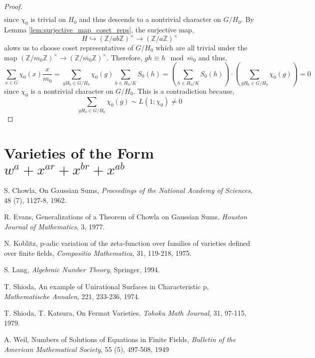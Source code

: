 \documentclass{article}
\newcommand{\Z}{\mathbb{Z}}
\theoremstyle{definition}
\theoremstyle{definition}
\theoremstyle{remark}
\begin{document}
\begin{proof}
\begin{align*}
\end{align*}
since $\chi_0$ is trivial on $H_0$ and thus descends to a nontrivial character on $G/H_0$. By Lemma \ref{lem:surjective_map_coset_reps}, the surjective map,
\[ H \hookrightarrow (\Z / ab \Z)^\times \to (\Z / a \Z)^\times \]
alows us to choose coset representatives of $G / H_0$ which are all trivial under the map $(\Z / m_0 \Z)^\times \to (\Z / \bar{m_0} \Z)^\times$. Therefore, $gh \equiv h \mod \bar{m_0}$ and thus,
\[ \sum_{x \in G} \chi_0(x) \frac{x}{m_0} = \sum_{gH_0 \in G/H_0} \chi_0(g)  \sum_{h \in H_0 / K} S_0(h) = \left( \sum_{h \in H_0 / K} S_0(h) \right) \cdot \left( \sum_{gH_0 \in G/H_0} \chi_0(g) \right) = 0 \]
since $\chi_0$ is a nontrivial character on $G / H_0$. This is a contradiction because,
\[ \sum_{gH_0 \in G/H_0} \chi_0(g) \sim L(1 ; \chi_0) \neq 0 \]
\end{proof}

\section{Varieties of the Form $w^{a} + x^{ar} + x^{br} + x^{ab}$}


\begin{thebibliography}{99}
S. Chowla, On Gaussian Sums, \textit{Proceedings of the National Academy of Sciences}, 48 (7), 1127-8, 1962.

R. Evans, Generalizations of a Theorem of Chowla on Gaussian Sums, \textit{Houston Journal of Mathematics}, 3, 1977.

N. Koblitz, p-adic variation of the zeta-function over families of varieties defined over finite fields, \textit{Compositio Mathematica}, 31, 119-218, 1975.

S. Lang, \textit{Algebraic Number Theory}, Springer, 1994.

T. Shioda, An example of Unirational Surfaces in Characteristic p, \textit{Mathematische Annalen}, 221, 233-236, 1974.

T. Shioda, T. Katsura, On Fermat Varieties, \textit{Tohoku Math Journal}, 31, 97-115, 1979.

A. Weil, Numbers of Solutions of Equations in Finite Fields, \textit{Bulletin of the American Mathematical Society}, 55 (5), 497-508, 1949



\end{thebibliography}
\end{document}
